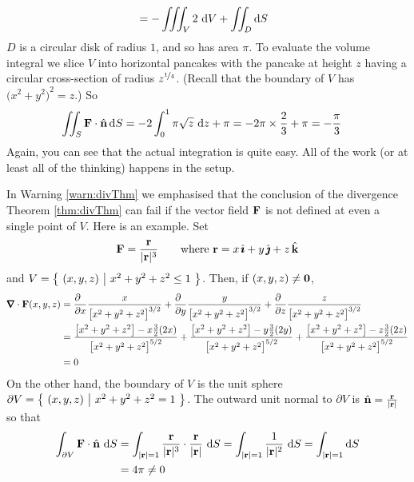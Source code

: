 \begin{eg}
\begin{align*}
&= -\iiint_V 2\ \mathrm{d}V 
  +\iint_{D} \mathrm{d}S 
\end{align*}
$D$ is a circular disk of radius $1$, and so has area $\pi$. To evaluate the
volume integral we slice $V$ into horizontal pancakes with the pancake at height $z$ having a circular cross-section of radius $z^{\nicefrac{1}{4}}$. 
(Recall that the boundary of $V$ has ${\big(x^2+y^2\big)}^2 = z$.) So 
\begin{align*}
\iint_S \mathbf{F}\cdot\hat{\mathbf{n}}\,\mathrm{d}S
&= -2\int_0^1\pi \sqrt{z}\ \mathrm{d}z 
  +\pi 
=-2\pi\times\frac{2}{3} +\pi
=-\frac{\pi}{3}
\end{align*}
Again, you can see that the actual integration is quite easy. All of the work 
(or at least all of the thinking) happens in the setup.
\end{eg} 

\begin{eg}\label{eg:divThmD}
In Warning \ref{warn:divThm} we emphasised that the conclusion of the
divergence Theorem \ref{thm:divThm} can fail if
the vector field $\mathbf{F}$ is not defined at even a single
point of $V$. Here is an example. Set
\begin{equation*}
\mathbf{F} = \frac{\mathbf{r}}{|\mathbf{r}|^3}
\qquad\text{where $\mathbf{r}=x\,\hat{\pmb{\imath}}+y\,\hat{\pmb{\jmath}} +z\,\hat{\mathbf{k}}$}
\end{equation*}
and $V=\big\{ \ (x,y,z)\ \big|\ x^2+y^2+z^2\le 1\ \big\}$.
Then, if $(x,y,z)\ne\mathbf{0}$,
\begin{align*}
\vnabla\cdot\vF(x,y,z)
&=\frac{\partial\hfill}{\partial x}\frac{x}{{\big[x^2+y^2+z^2\big]}^{3/2}}
+\frac{\partial\hfill}{\partial y}\frac{y}{{\big[x^2+y^2+z^2\big]}^{3/2}}
+\frac{\partial\hfill}{\partial z}\frac{z}{{\big[x^2+y^2+z^2\big]}^{3/2}}
\\
&=\frac{\big[x^2+y^2+z^2\big]-x\frac{3}{2}(2x)}{{\big[x^2+y^2+z^2\big]}^{5/2}}
+\frac{\big[x^2+y^2+z^2\big]-y\frac{3}{2}(2y)}{{\big[x^2+y^2+z^2\big]}^{5/2}}
+\frac{\big[x^2+y^2+z^2\big]-z\frac{3}{2}(2z)}{{\big[x^2+y^2+z^2\big]}^{5/2}}
\\
&=0
\end{align*}
On the other hand, the boundary of $V$ is the unit sphere
$\partial V = \big\{ \ (x,y,z)\ \big|\ x^2+y^2+z^2 = 1\ \big\}$. The outward unit 
normal to $\partial V$
is $\hat{\mathbf{n}} = \frac{\mathbf{r}}{|\mathbf{r}|}$ so that
\begin{align*}
\int_{\partial V}\vF\cdot\hn\ \dee{S}
&=\int_{|\vr|=1}  \frac{\vr}{|\vr|^3}\cdot \frac{\vr}{|\vr|}\ \dee{S} 
=\int_{|\vr|=1}  \frac{1}{|\vr|^2}\ \dee{S}
=\int_{|\vr|=1}\dee{S} \\
&=4\pi\ne 0
\end{align*}


\end{eg}



